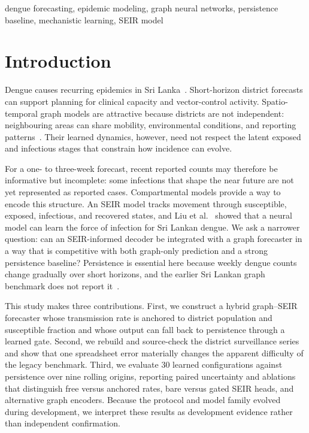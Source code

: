 \documentclass[conference]{IEEEtran}
\begin{document}
\begin{IEEEkeywords}
dengue forecasting, epidemic modeling, graph neural networks, persistence baseline, mechanistic learning, SEIR model
\end{IEEEkeywords}

\section{Introduction}
Dengue causes recurring epidemics in Sri Lanka~\cite{tissera2020severe}.
Short-horizon district forecasts can support planning for clinical capacity and vector-control activity.
Spatio-temporal graph models are attractive because districts are not independent: neighbouring areas can share mobility, environmental conditions, and reporting patterns~\cite{weng2024graph}.
Their learned dynamics, however, need not respect the latent exposed and infectious stages that constrain how incidence can evolve.

For a one- to three-week forecast, recent reported counts may therefore be informative but incomplete: some infections that shape the near future are not yet represented as reported cases.
Compartmental models provide a way to encode this structure.
An SEIR model tracks movement through susceptible, exposed, infectious, and recovered states, and Liu et al.~\cite{liu2025seirlstm} showed that a neural model can learn the force of infection for Sri Lankan dengue.
We ask a narrower question: can an SEIR-informed decoder be integrated with a graph forecaster in a way that is competitive with both graph-only prediction and a strong persistence baseline?
Persistence is essential here because weekly dengue counts change gradually over short horizons, and the earlier Sri Lankan graph benchmark does not report it~\cite{weng2024graph}.

This study makes three contributions.
First, we construct a hybrid graph--SEIR forecaster whose transmission rate is anchored to district population and susceptible fraction and whose output can fall back to persistence through a learned gate.
Second, we rebuild and source-check the district surveillance series and show that one spreadsheet error materially changes the apparent difficulty of the legacy benchmark.
Third, we evaluate 30 learned configurations against persistence over nine rolling origins, reporting paired uncertainty and ablations that distinguish free versus anchored rates, bare versus gated SEIR heads, and alternative graph encoders.
Because the protocol and model family evolved during development, we interpret these results as development evidence rather than independent confirmation.
\end{document}
